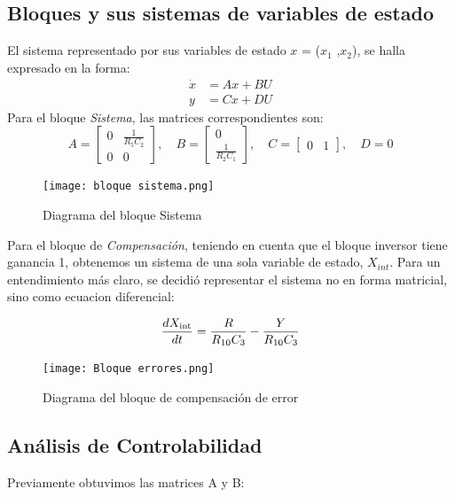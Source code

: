 \documentclass[letterpaper, 10 pt, conference]{ieeeconf}  %
\begin{document}
\subsection{Bloques y sus sistemas de variables de estado}
El sistema representado por sus variables de estado $x$ = ($x_1$ ,$x_2$), se halla expresado en la forma:
\[
\begin{aligned}
\dot{x} &= Ax + BU \\
 y &= Cx + DU
\end{aligned}
\]
Para el bloque \textit{Sistema}, las matrices correspondientes son:
\\
\[ 
A = \begin{bmatrix}
0 & \frac{1}{R_5C_2} \\
0 & 0
\end{bmatrix}, \quad
B = \begin{bmatrix}
0 \\
\frac{1}{R_2C_1}
\end{bmatrix}, \quad 
C = \begin{bmatrix}
0 & 1
\end{bmatrix}, \quad
D = 0
\] 

\begin{figure}[H]
  \centering
  \texttt{[image: bloque sistema.png]}
  \caption{Diagrama del bloque Sistema}
  \label{fig:diag_elect_esq}
\end{figure}

Para el bloque de \textit{Compensación}, teniendo en cuenta que el bloque inversor tiene ganancia 1, obtenemos un sistema de una sola variable de estado, $X_{int}$. Para un entendimiento más claro, se decidió representar el sistema no en forma matricial, sino como ecuacion diferencial:

 \begin{equation}
        \frac{dX_{\text{int}}}{dt} = \frac{R}{R_{10}C_3} - \frac{Y}{R_{10}C_3}  \\
        \end{equation}

\begin{figure}[H]
  \centering
  \texttt{[image: Bloque errores.png]}
  \caption{Diagrama del bloque de compensación de error}
  \label{fig:diag_elect_esq}
\end{figure}


\subsection{Análisis de Controlabilidad} 
Previamente obtuvimos las matrices A y B:
\end{document}
